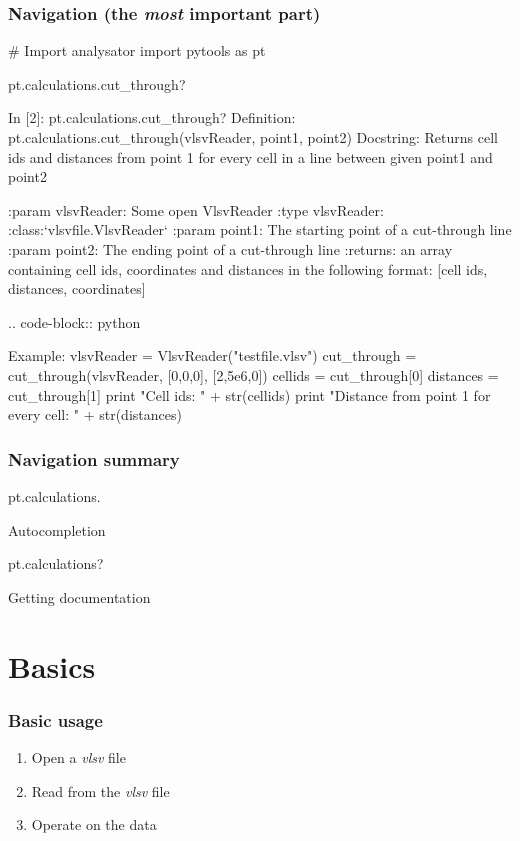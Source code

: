 \documentclass{beamer}
\begin{document}
\begin{frame}[fragile]
 \frametitle{Navigation (the \emph{most} important part)}
 \begin{python}[basicstyle=\tiny]
  # Import analysator
  import pytools as pt
  
  pt.calculations.cut_through?
 \end{python}
 \begin{python}[basicstyle=\tiny]
In [2]: pt.calculations.cut_through?
Definition: pt.calculations.cut_through(vlsvReader, point1, point2)
Docstring:
Returns cell ids and distances from point 1 for every cell in a line between 
given point1 and point2

:param vlsvReader:       Some open VlsvReader
:type vlsvReader:        :class:`vlsvfile.VlsvReader`
:param point1:           The starting point of a cut-through line
:param point2:           The ending point of a cut-through line
:returns: an array containing cell ids, coordinates and distances in the following 
format: [cell ids, distances, coordinates]

.. code-block:: python

   Example:
   vlsvReader = VlsvReader("testfile.vlsv")
   cut_through = cut_through(vlsvReader, [0,0,0], [2,5e6,0])
   cellids = cut_through[0]
   distances = cut_through[1]
   print "Cell ids: " + str(cellids)
   print "Distance from point 1 for every cell: " + str(distances)

 \end{python}
\end{frame}

\begin{frame}[fragile]
 \frametitle{Navigation summary}
 \begin{python}[basicstyle=\tiny]
  pt.calculations.
 \end{python}
  Autocompletion
 \begin{python}[basicstyle=\tiny]
  pt.calculations?
 \end{python}
  Getting documentation
\end{frame}


\section{Basics}

\begin{frame}
 \frametitle{Basic usage}
 \begin{enumerate}
  \item Open a \emph{vlsv} file
  \item Read from the \emph{vlsv} file
  \item Operate on the data
 \end{enumerate}
\end{frame}
\end{document}
